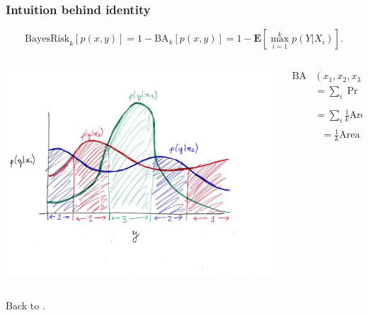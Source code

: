 \documentclass{beamer}
\newcommand{\E}{\textbf{E}}
\begin{document}
\begin{frame}[label=supplemental]
\frametitle{Intuition behind identity}
\[
\text{BayesRisk}_k[p(x, y)] = 1 - \text{BA}_k[p(x, y)] = 1-\E[\max_{i=1}^k p(Y|X_i)].
\]
\begin{columns}
\begin{column}{0.5\textwidth}
\begin{center}
\includegraphics[scale = 0.35, clip = true, trim = 1.2in 1.3in 0in 1in]{var_ba.png}
\end{center}   
\end{column}
\begin{column}{0.5\textwidth}  %
\begin{align*}
\text{BA}&(x_1,x_2,x_3) \\&= \sum_i \Pr[x_i]\Pr_{Y \sim p(y|x_i)}[Y \in \text{zone }i]
\\&= \sum_i \frac{1}{k} \text{Area under curve $i$ in zone $i$}
\\&\ \ \ = \frac{1}{k} \text{Area under } \max_{i=1}^k p(y|x_i)
\end{align*}
\end{column}
\end{columns}
Back to \hyperlink{main}{}.
\end{frame}
\end{document}
